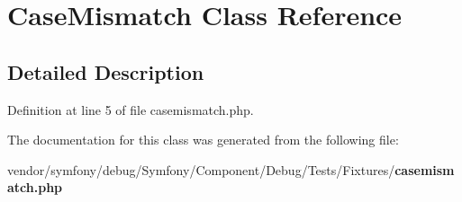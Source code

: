 \section{Case\+Mismatch Class Reference}
\label{class_symfony_1_1_component_1_1_debug_1_1_tests_1_1_fixtures_1_1_case_mismatch}


\subsection{Detailed Description}


Definition at line 5 of file casemismatch.\+php.



The documentation for this class was generated from the following file\+:\begin{DoxyCompactItemize}
\item 
vendor/symfony/debug/\+Symfony/\+Component/\+Debug/\+Tests/\+Fixtures/{\bf casemismatch.\+php}\end{DoxyCompactItemize}

